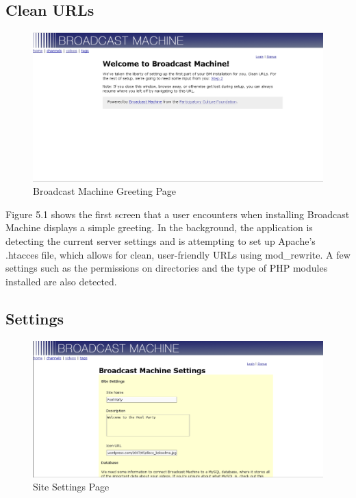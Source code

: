\documentclass[a4paper,12pt]{report}
\begin{document}
\subsection{Clean URLs}
  \begin{figure}[htp]
  \begin{center}
  \includegraphics[width=150mm]{./images/setup1.png}
  \caption{Broadcast Machine Greeting Page}
  \end{center}
  \end{figure}
Figure 5.1 shows the first screen that a user encounters when installing Broadcast Machine displays a simple greeting.
In the background, the application is detecting the current server settings and is attempting to set up Apache's .htacces file, which allows for clean, user-friendly URLs using mod\_rewrite.
A few settings such as the permissions on directories and the type of PHP modules installed are also detected.

\subsection{Settings}
\begin{figure}[htp]
\begin{center}
\includegraphics[width=150mm]{./images/setup2.png}
\caption{Site Settings Page}
\end{center}
\end{figure}
\end{document}

